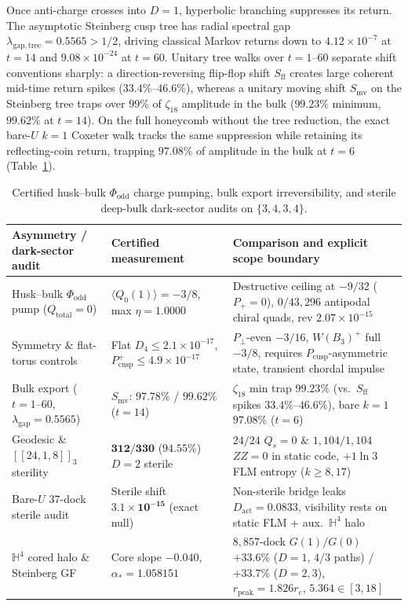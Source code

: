 Once anti-charge crosses into $D = 1$, hyperbolic branching suppresses its return. The asymptotic Steinberg cusp tree
has radial spectral gap $\lambda_{\mathrm{gap,tree}} = 0.5565 > 1/2$, driving classical Markov returns down to
$4.12 \times 10^{-7}$ at $t = 14$ and $9.08 \times 10^{-24}$ at $t = 60$. Unitary tree walks over $t = 1\text{--}60$
separate shift conventions sharply: a direction-reversing flip-flop shift $S_{\mathrm{ff}}$ creates large coherent
mid-time return spikes ($33.4\%\text{--}46.6\%$), whereas a unitary moving shift $S_{\mathrm{mv}}$ on the Steinberg
tree traps over $99\%$ of $\zeta_{18}$ amplitude in the bulk ($99.23\%$ minimum, $99.62\%$ at $t = 14$). On the full
honeycomb without the tree reduction, the exact bare-$U$ $k = 1$ Coxeter walk tracks the same suppression while
retaining its reflecting-coin return, trapping $97.08\%$ of amplitude in the bulk at $t = 6$
(Table~\ref{tab:husk-dark}).

\begin{table}[tb]
\centering
\caption{Certified husk--bulk $\Phi_{\mathrm{odd}}$ charge pumping, bulk export irreversibility, and sterile deep-bulk
dark-sector audits on $\{3,4,3,4\}$.}
\label{tab:husk-dark}
\footnotesize
\begin{tabularx}{\textwidth}{@{}>{\raggedright\arraybackslash}p{4.10cm}>{\raggedright\arraybackslash}p{3.45cm}>{\raggedright\arraybackslash}X@{}}
\toprule
Asymmetry / dark-sector audit & Certified measurement & Comparison and explicit scope boundary \\
\midrule
Husk--bulk $\Phi_{\mathrm{odd}}$ pump ($Q_{\mathrm{total}} = 0$) & $\langle Q_0(1)\rangle = -3/8$, max $\eta = \mathbf{1.0000}$ & Destructive ceiling at $-9/32$ ($P_+ = 0$), $0/43{,}296$ antipodal chiral quads, rev $2.07 \times 10^{-15}$ \\
Symmetry \& flat-torus controls & Flat $D_4 \le 2.1 \times 10^{-17}$, $P_{\mathrm{cusp}}^+ \le 4.9 \times 10^{-17}$ & $P_\perp$-even $-3/16$, $W(B_3)^+$ full $-3/8$, requires $P_{\mathrm{cusp}}$-asymmetric state, transient chordal impulse \\
Bulk export ($t = 1\text{--}60$, $\lambda_{\mathrm{gap}} = 0.5565$) & $S_{\mathrm{mv}}$: $\mathbf{97.78\%}$ / $\mathbf{99.62\%}$ ($t = 14$) & $\zeta_{18}$ min trap $99.23\%$ (vs.\ $S_{\mathrm{ff}}$ spikes $33.4\%\text{--}46.6\%$), bare $k{=}1$ $97.08\%$ ($t = 6$) \\
Geodesic \& $[[24,1,8]]_3$ sterility & $\mathbf{312/330}$ ($94.55\%$) $D = 2$ sterile & $24/24$ $Q_s = 0$ \& $1{,}104/1{,}104$ $ZZ = 0$ in static code, $+1\ln 3$ FLM entropy ($k \ge 8, 17$) \\
Bare-$U$ 37-dock sterile audit & Sterile shift $\mathbf{3.1 \times 10^{-15}}$ (exact null) & Non-sterile bridge leaks $D_{\mathrm{act}} = 0.0833$, visibility rests on static FLM + aux.\ $\mathbb{H}^4$ halo \\
$\mathbb{H}^4$ cored halo \& Steinberg GF & Core slope $-0.040$, $\alpha_* = 1.058151$ & $8{,}857$-dock $G(1)/G(0)$ $+33.6\%$ ($D{=}1$, $4/3$ paths) / $+33.7\%$ ($D{=}2,3$), $r_{\mathrm{peak}} = 1.826 r_c$, $5.364 \in [3, 18]$ \\
\bottomrule
\end{tabularx}
\end{table}

